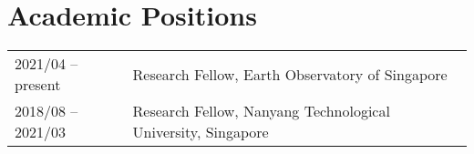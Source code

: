 \section*{Academic Positions}
\begin{tabular}{p{} p{}}
2021/04 -- present & Research Fellow, Earth Observatory of Singapore \\
2018/08 -- 2021/03 & Research Fellow, Nanyang Technological University, Singapore \\
\end{tabular}
